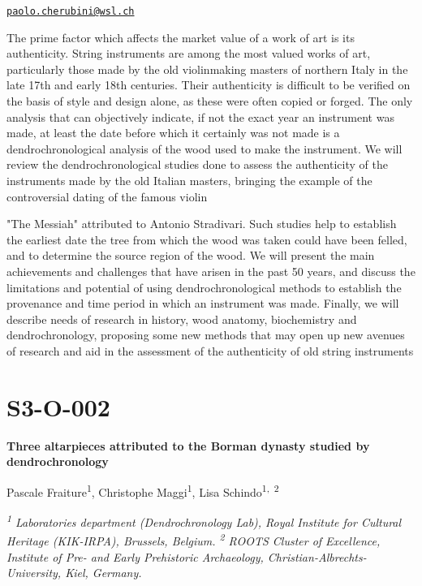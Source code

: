 \documentclass[
]{book}
\begin{document}
\href{mailto:paolo.cherubini@wsl.ch}{\nolinkurl{paolo.cherubini@wsl.ch}}

The prime factor which affects the market value of a work of art is its authenticity. String instruments are among the most valued works of art, particularly those made by the old violinmaking masters of northern Italy in the late 17th and early 18th centuries. Their authenticity is difficult to be verified on the basis of style and design alone, as these were often copied or forged. The only analysis that can objectively indicate, if not the exact year an instrument was made, at least the date before which it certainly was not made is a dendrochronological analysis of the wood used to make the instrument. We will review the dendrochronological studies done to assess the authenticity of the instruments made by the old Italian masters, bringing the example of the controversial dating of the famous violin

"The Messiah" attributed to Antonio Stradivari. Such studies help to establish the earliest date the tree from which the wood was taken could have been felled, and to determine the source region of the wood. We will present the main achievements and challenges that have arisen in the past 50 years, and discuss the limitations and potential of using dendrochronological methods to establish the provenance and time period in which an instrument was made. Finally, we will describe needs of research in history, wood anatomy, biochemistry and dendrochronology, proposing some new methods that may open up new avenues of research and aid in the assessment of the authenticity of old string instruments

\hypertarget{s3-o-002}{%
\section*{S3-O-002}\label{s3-o-002}}

\textbf{Three altarpieces attributed to the Borman dynasty studied by dendrochronology}

Pascale Fraiture\textsuperscript{1}, Christophe Maggi\textsuperscript{1}, Lisa Schindo\textsuperscript{1,~2}

\emph{\textsuperscript{1} Laboratories department (Dendrochronology Lab), Royal Institute for Cultural Heritage (KIK-IRPA), Brussels, Belgium. \textsuperscript{2} ROOTS Cluster of Excellence, Institute of Pre- and Early Prehistoric Archaeology, Christian-Albrechts-University, Kiel, Germany.}
\end{document}
